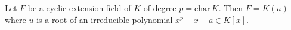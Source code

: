 Let $F$ be a cyclic extension field of $K$ of degree $p = \mathrm{char}\,K$. Then $F = K(u)$ where $u$ is a root of an irreducible polynomial $x^p - x - a \in K[x]$.
